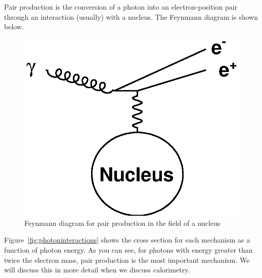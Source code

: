Pair production is the conversion of a photon into an electron-position pair through an interaction (usually) with a nucleus.  The Feynmann diagram is shown below.


\begin{figure}[h]
\centering\includegraphics[scale=0.5]{./particleinteractions/Pictures/pairproduction.eps}
\caption{Feynmann diagram for pair production in the field of a nucleus}
\label{fig:pairproduction}
\end{figure}



Figure~\ref{fig:photoninteractions} shows the cross section for each mechanism as a 
function of photon energy.  As you can see, for photons with energy greater than twice the 
electron mass, pair production is the most important mechanism.  We will discuss this in more detail when we discuss calorimetry.



